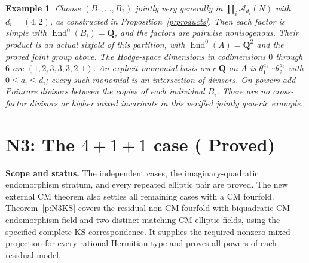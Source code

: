 \documentclass[11pt,reqno]{article}
\theoremstyle{emphasizedplain}
\DeclareRobustCommand{\provedstatus}{%
  \texorpdfstring{\textcolor{ProvedGreen}{\textbf{Proved}}}{Proved}}
\theoremstyle{emphasizeddefinition}
\newtheorem{example}[theorem]{Example}
\theoremstyle{emphasizeddefinition}
\DeclareMathOperator{\End}{End}
\newcommand{\Q}{\mathbf Q}
\newcommand{\status}[1]{%
  \par\nobreak\smallskip\noindent
  {\setlength{\fboxsep}{7pt}%
   \colorbox{ScopeBackground}{%
    \parbox{\dimexpr\linewidth-2\fboxsep\relax}{%
     \small\textbf{\textcolor{HeadingInk}{Scope and status.}} #1}}}%
  \par\nobreak\medskip}
\begin{document}
\begin{example}
Choose $(B_1,\ldots,B_{2})$ jointly very generally in
$\prod_i\mathcal A_{d_i}(N)$ with $d_i=(4,2)$,
as constructed in Proposition~\ref{p:products}. Then each factor is
simple with $\End^0(B_i)=\Q$, and the factors are pairwise nonisogenous.
Their product is an actual sixfold of this partition, with
$\End^0(A)=\Q^{2}$ and the proved joint group above.
The Hodge-space dimensions in codimensions $0$ through $6$ are
$(1,2,3,3,3,2,1)$.
An explicit monomial basis over $\Q$ on $A$ is
$\theta_1^{a_1}\cdots\theta_{2}^{a_{2}}$ with
$0\leq a_i\leq d_i$; every such monomial is an intersection of divisors.
On powers add Poincare divisors between the copies of each individual
$B_i$. There are no cross-factor divisors or higher mixed invariants in
this verified jointly generic example.
\end{example}
\section{N3: The \texorpdfstring{$4+1+1$}{4+1+1} case (\provedstatus)}\label{sec:N3}

\status{The independent cases, the imaginary-quadratic endomorphism
stratum, and every repeated elliptic pair are proved. The new external
CM theorem also settles all remaining cases with a CM fourfold.
Theorem~\ref{p:N3KS} covers the residual non-CM fourfold with
biquadratic CM endomorphism field and two distinct matching CM
elliptic fields, using the specified complete KS correspondence.
It supplies the required nonzero mixed projection for every rational
Hermitian type and proves all powers of each residual model.}
\end{document}
